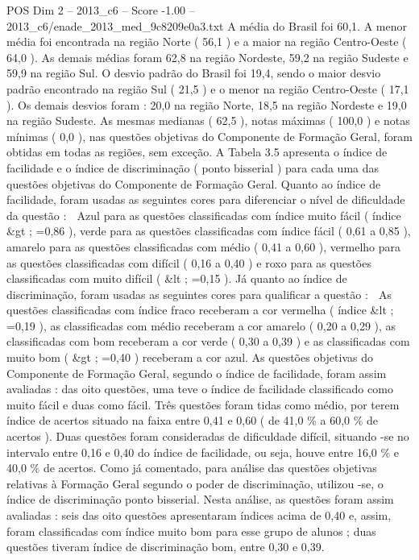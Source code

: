 \begin{textsample}{POS Dim 2 – 2013\_c6 – Score -1.00 – 2013\_c6/enade\_2013\_med\_9c8209e0a3.txt}
A média do Brasil foi 60,1.
A menor média foi encontrada na região Norte ( 56,1 ) e a maior na região Centro-Oeste ( 64,0 ).
As demais médias foram 62,8 na região Nordeste, 59,2 na região Sudeste e 59,9 na região Sul.
O desvio padrão do Brasil foi 19,4, sendo o maior desvio padrão encontrado na região Sul ( 21,5 ) e o menor na região Centro-Oeste ( 17,1 ).
Os demais desvios foram : 20,0 na região Norte, 18,5 na região Nordeste e 19,0 na região Sudeste.
As mesmas medianas ( 62,5 ), notas máximas ( 100,0 ) e notas mínimas ( 0,0 ), nas questões objetivas do Componente de Formação Geral, foram obtidas em todas as regiões, sem exceção.
A Tabela 3.5 apresenta o índice de facilidade e o índice de discriminação ( ponto bisserial ) para cada uma das questões objetivas do Componente de Formação Geral.
Quanto ao índice de facilidade, foram usadas as seguintes cores para diferenciar o nível de dificuldade da questão :  Azul para as questões classificadas com índice muito fácil ( índice \&gt ; =0,86 ), verde para as questões classificadas com índice fácil ( 0,61 a 0,85 ), amarelo para as questões classificadas com médio ( 0,41 a 0,60 ), vermelho para as questões classificadas com difícil ( 0,16 a 0,40 ) e roxo para as questões classificadas com muito difícil ( \&lt ; =0,15 ).
Já quanto ao índice de discriminação, foram usadas as seguintes cores para qualificar a questão :  As questões classificadas com índice fraco receberam a cor vermelha ( índice \&lt ; =0,19 ), as classificadas com médio receberam a cor amarelo ( 0,20 a 0,29 ), as classificadas com bom receberam a cor verde ( 0,30 a 0,39 ) e as classificadas com muito bom ( \&gt ; =0,40 ) receberam a cor azul.
As questões objetivas do Componente de Formação Geral, segundo o índice de facilidade, foram assim avaliadas : das oito questões, uma teve o índice de facilidade classificado como muito fácil e duas como fácil.
Três questões foram tidas como médio, por terem índice de acertos situado na faixa entre 0,41 e 0,60 ( de 41,0 \% a 60,0 \% de acertos ).
Duas questões foram consideradas de dificuldade difícil, situando -se no intervalo entre 0,16 e 0,40 do índice de facilidade, ou seja, houve entre 16,0 \% e 40,0 \% de acertos.
Como já comentado, para análise das questões objetivas relativas à Formação Geral segundo o poder de discriminação, utilizou -se, o índice de discriminação ponto bisserial.
Nesta análise, as questões foram assim avaliadas : seis das oito questões apresentaram índices acima de 0,40 e, assim, foram classificadas com índice muito bom para esse grupo de alunos ; duas questões tiveram índice de discriminação bom, entre 0,30 e 0,39.

\end{textsample}
